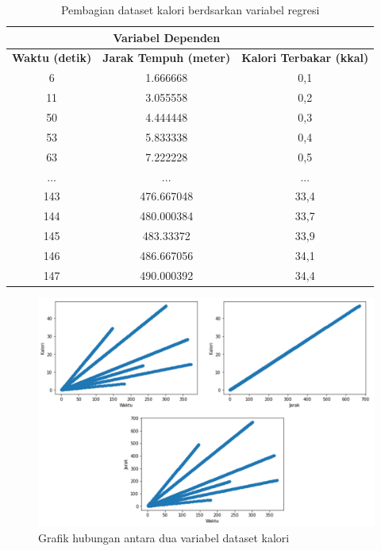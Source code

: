 \begin{longtable}{|c|c|c|}
  \caption{Pembagian dataset kalori berdsarkan variabel regresi}
  \label{tb:VariabelPrediksiKalori}                                   \\
  \hline
  \rowcolor[HTML]{C0C0C0}
  \multicolumn{2}{|c|}{\textbf{Variabel Independen}}  & \textbf{Variabel Dependen}  \\
  \hline
  \rowcolor[HTML]{C0C0C0}
  \textbf{Waktu (detik)} & \textbf{Jarak Tempuh (meter)} & \textbf{Kalori Terbakar (kkal)} \\
  \hline
  6    & 1.666668    & 0,1     \\
  \hline
  11    & 3.055558    & 0,2     \\
  \hline
  50    & 4.444448    & 0,3     \\
  \hline
  53    & 5.833338    & 0,4     \\
  \hline
  63    & 7.222228    & 0,5     \\
  \hline
  ...    & ...    & ...     \\
  \hline
  143    & 476.667048    & 33,4     \\
  \hline
  144    & 480.000384    & 33,7     \\
  \hline
  145    & 483.33372    & 33,9     \\
  \hline
  146    & 486.667056    & 34,1     \\
  \hline
  147    & 490.000392    & 34,4     \\
  \hline
\end{longtable}

\begin{figure}[H]
  \centering
  \includegraphics[scale=0.27]{gambar/plot regresi kalori2.png}
  \caption{Grafik hubungan antara dua variabel dataset kalori}
  \label{fig:plotregresiall}
\end{figure}

